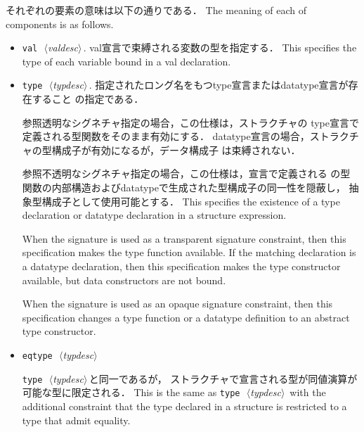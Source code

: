 \documentclass{jbook}
\newcommand{\nonterm}[1]{\mbox{$\,\langle$}{\it #1}\mbox{$\rangle\,$}}
\newcommand{\term}[1]{\mbox{{\tt #1}}}
\begin{document}
\ifjp%
	それぞれの要素の意味は以下の通りである．
\else%
	The meaning of each of components is as follows.
\fi%
\begin{itemize}
\item \term{val}\ \nonterm{valdesc}. 
\ifjp%
	val宣言で束縛される変数の型を指定する．
\else%
	This specifies the type of each variable bound in a val
declaration. 
\fi%

\item \term{type}\ \nonterm{typdesc}. 
\ifjp%
	指定されたロング名をもつtype宣言またはdatatype宣言が存在すること
の指定である．

	参照透明なシグネチャ指定の場合，この仕様は，ストラクチャの
type宣言で定義される型関数をそのまま有効にする．
	datatype宣言の場合，ストラクチャの型構成子が有効になるが，データ構成子
は束縛されない．
	
	参照不透明なシグネチャ指定の場合，この仕様は，宣言で定義される
の型関数の内部構造およびdatatypeで生成された型構成子の同一性を隠蔽し，
抽象型構成子として使用可能とする．
\else%
	This specifies the existence of a type declaration or datatype
declaration in a structure expression.

	When the signature is used as a transparent signature
constraint, then this specification makes the type function available.
	If the matching declaration is a datatype declaration, then this
specification makes the type constructor available, but data
constructors are not bound.

	When the signature is used as an opaque signature
constraint, then this specification changes a type function or a
datatype definition to an abstract type constructor.
\fi%

\item \term{eqtype}\  \nonterm{typdesc}

\ifjp%
	\term{type}\  \nonterm{typdesc}と同一であるが，
ストラクチャで宣言される型が同値演算が可能な型に限定される．
\else%
	This is the same as \term{type}\  \nonterm{typdesc} with the
additional constraint that the type declared in a structure is
restricted to a type that admit equality.
\fi%


\end{itemize}
\end{document}
